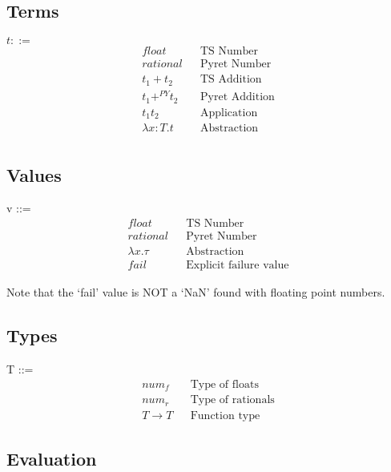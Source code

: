 \documentclass{article}
\begin{document}
	\subsection{Terms}
	$t ::=$
	\begin{align*}
		float 		  								&& \text{TS Number} \\
		rational	  								&& \text{Pyret Number} \\
		t_1 + t_2 									&& \text{TS Addition} \\
		t_1 +^{PY} t_2 								&& \text{Pyret Addition} \\
		t_1 t_2 							    	&& \text{Application} \\
		\lambda x\colon T. t					    && \text{Abstraction} \\
	\end{align*}


	\subsection{Values}
	v ::=
	\begin{align*}
		float						&& \text{TS Number} \\
		rational					&& \text{Pyret Number}\\
		\lambda x. \tau		    	&& \text{Abstraction} \\
		fail						&& \text{Explicit failure value}
	\end{align*}

	Note that the `fail' value is NOT a `NaN' found with floating point numbers.

	\subsection{Types}
	T ::=
	\begin{align*}
		num_f				&& \text{Type of floats}\\
		num_r				&& \text{Type of rationals}\\
		T \rightarrow T		&& \text{Function type}
	\end{align*}
	
	
	\subsection{Evaluation}
	
\end{document}
